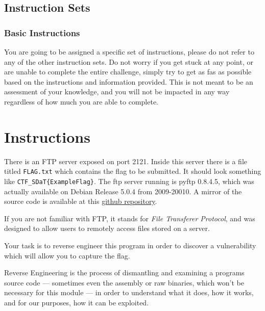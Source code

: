     \subsection{Instruction Sets}\label{subsubsec:CTFs-gb-instructions}

        \subsubsection{Basic Instructions}
            {\parindent0pt\singlespacing
                You are going to be assigned a specific set of instructions, please do not refer to any of the other instruction sets.
                Do not worry if you get stuck at any point, or are unable to complete the entire challenge, simply try to get as fas as possible based on the instructions and information provided. This is not meant to be an assessment of your knowledge, and you will not be impacted in any way regardless of how much you are able to complete. 

                \section*{Instructions}
                    There is an FTP server exposed on port 2121. Inside this server there is a file titled \lstinline`FLAG.txt` which contains the flag to be submitted. It should look something like \lstinline`CTF_SDaT{ExampleFlag}`. The ftp server running is pyftp 0.8.4.5, which was actually available on Debian Release 5.0.4 from 2009-20010. A mirror of the source code is available at this \href{https://github.com/brendonky18/pyftpd-0.8.4.5_mirror}{github repository}.

                    If you are not familiar with FTP, it stands for \textit{File Transferer Protocol}, and was designed to allow users to remotely access files stored on a server. 

                    Your task is to reverse engineer this program in order to discover a vulnerability which will allow you to capture the flag.

                    Reverse Engineering is the process of dismantling and examining a programs source code — sometimes even the assembly or raw binaries, which won't be necessary for this module — in order to understand what it does, how it works, and for our purposes, how it can be exploited.
}
